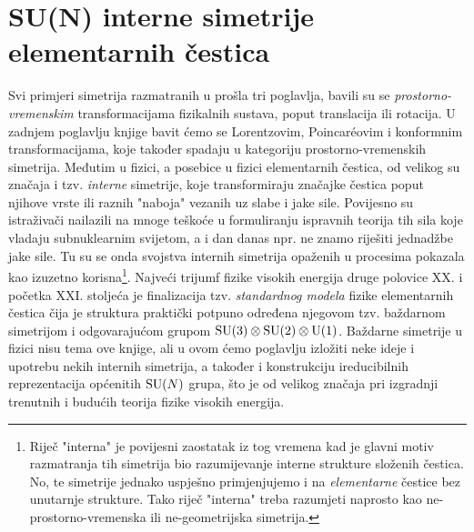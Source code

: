 
\chapter{SU(N) interne simetrije elementarnih čestica}

Svi primjeri simetrija razmatranih u prošla tri poglavlja,
bavili su se \emph{pros\-tor\-no-vre\-men\-skim} transformacijama fizikalnih
sustava, poput translacija ili rotacija. U zadnjem poglavlju knjige
bavit ćemo se Lorentzovim, Poincar\'{e}ovim i konformnim
transformacijama, koje također spadaju u kategoriju prostorno-vremenskih simetrija.
Međutim u fizici, a posebice u fizici elementarnih čestica,
od velikog su značaja i tzv. \emph{interne} simetrije, koje
transformiraju značajke čestica poput njihove vrste ili
raznih "naboja" vezanih uz slabe i jake sile.
Povijesno su istraživači nailazili na mnoge teškoće u formuliranju
ispravnih teorija tih sila koje vladaju subnuklearnim svijetom,
a i dan danas npr. ne znamo riješiti jednadžbe jake sile. Tu su se onda svojstva internih simetrija
opaženih u procesima pokazala kao izuzetno korisna\footnote{Riječ
    "interna" je povijesni zaostatak iz tog vremena kad je glavni
    motiv razmatranja tih simetrija bio razumijevanje interne strukture složenih
    čestica. No, te simetrije jednako uspješno primjenjujemo i na \emph{elementarne} čestice
    bez unutarnje strukture. Tako riječ "interna" treba razumjeti naprosto
kao ne-prostorno-vremenska ili ne-geometrijska simetrija.}.
Najveći trijumf fizike visokih energija druge polovice XX. i početka
XXI. stoljeća je finalizacija tzv. \emph{standardnog modela} fizike elementarnih
čestica čija je struktura praktički potpuno određena njegovom
tzv. baždarnom simetrijom i odgovarajućom grupom $\mathrm{SU}(3) \otimes \mathrm{SU}(2) \otimes \mathrm{U}(1)$. 
Baždarne simetrije u fizici nisu tema ove knjige, ali u ovom ćemo poglavlju
izložiti neke ideje i upotrebu nekih internih simetrija, a također
i konstrukciju ireducibilnih reprezentacija općenitih $\mathrm{SU}(N)$ grupa,
što je od velikog značaja pri izgradnji trenutnih i budućih teorija
fizike visokih energija.



